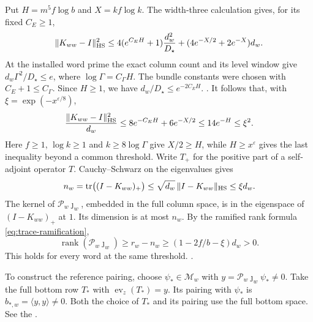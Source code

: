 Put \(H=m^5 f\log b\) and \(X=k f\log k\). The width-three
calculation gives, for its fixed \(C_E\ge1\),
\[
 \|K_{ww}-I\|_{\rm HS}^2
 \le 4(e^{C_EH}+1)\frac{d_w^2}{D_\star}
     +(4e^{-X/2}+2e^{-X})d_w .
\]
At the installed word prime the exact column count and its level
window give \(d_w\Gamma^2/D_\star\le e\), where
\(\log\Gamma=C_\Gamma H\). The bundle constants were chosen with
\(C_E+1\le C_\Gamma\). Since \(H\ge1\), we have
\(d_w/D_\star\le e^{-2C_EH}\).
.
It follows that, with \(\xi=\exp(-x^{\varepsilon/8})\),
\begin{equation}
\label{eq:period-early-full-diagonal}
 \frac{\|K_{ww}-I\|_{\rm HS}^2}{d_w}
 \le 8e^{-C_E H}+6e^{-X/2}\le 14e^{-H}\le\xi^2 .
\end{equation}
Here \(f\ge1\), \(\log k\ge1\) and \(k\ge8\log\Gamma\) give
\(X/2\ge H\), while \(H\ge x^\varepsilon\) gives the last inequality
beyond a common threshold. Write \(T_+\) for the positive part of a
self-adjoint operator \(T\). Cauchy--Schwarz on the eigenvalues gives
\[
 n_w=\operatorname{tr}\bigl((I-K_{ww})_+\bigr)
 \le\sqrt{d_w}\,\|I-K_{ww}\|_{\rm HS}\le\xi d_w .
\]
The kernel of \(\mathcal P_w\jmath_w\),
embedded in the full column space, is in the eigenspace of
\((I-K_{ww})_+\) at \(1\). Its dimension is at most \(n_w\).
By the ramified rank formula \eqref{eq:trace-ramification},
\[
 \operatorname{rank}(\mathcal P_w\jmath_w)
 \ge r_w-n_w\ge (1-2f/b-\xi)d_w>0 .
\]
This holds for every word at the same threshold.
.

To construct the reference pairing, choose \(\psi_*\in\mathcal M_w\)
with \(y=\mathcal P_w\jmath_w\psi_*\ne0\). Take the full bottom row
\(T_*\) with \(\operatorname{ev}_z(T_*)=y\). Its pairing with
\(\psi_*\) is \(b_{*,w}=\langle y,y\rangle\ne0\). Both the choice of
\(T_*\) and its pairing use the full bottom space. See the
.

